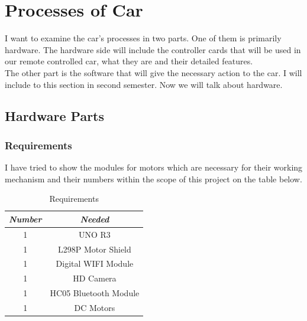 \documentclass[11pt]{article}
\begin{document}
\pagebreak
\section{Processes of Car}
\begin{flushleft}
I want to examine the car’s processes in two parts. One of them is primarily hardware. The hardware side will include the controller cards that will be used in our remote controlled car, what they are and their detailed features.\\
\vspace{0.2cm}
The other part is the software that will give the necessary action to the car. I will include to this section in second semester. Now we will talk about hardware.
\end{flushleft}

\vspace{0.3cm}

\subsection{Hardware Parts}
\subsubsection{Requirements}
\begin{flushleft}
I have tried to show the modules for motors which are necessary for their working mechanism and their numbers within the scope of this project on the table below.
\vspace{0.2cm}
\end{flushleft}
\begin{table}[h]
\centering 
\begin{tabular}{|c|c|}
 \hline
 \textbf{\emph{\cellcolor{red!27}Number}} & \textbf{\emph{\cellcolor{red!27}Needed}}	\\ [0.5ex] \hline
 1 & UNO R3 \\  \hline
 1 & L298P Motor Shield \\  \hline
 1 & Digital WIFI Module \\  \hline
 1 & HD Camera \\  \hline
 1 & HC05 Bluetooth Module \\ \hline
 1 & DC Motors \\
 \hline
\end{tabular}
\caption{Requirements}
\label{table:1}
\end{table}
\end{document}
